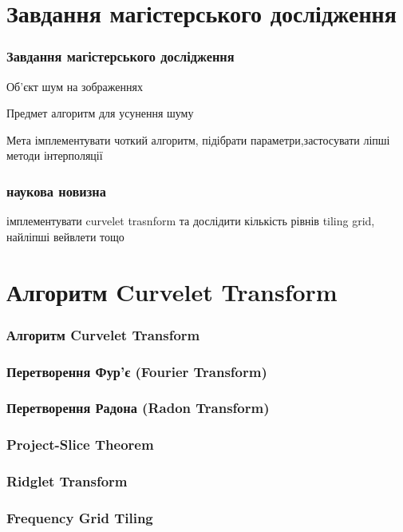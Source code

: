 \documentclass[12pt]{beamer}
\begin{document}
\section{Завдання магістерського дослідження}
\begin{frame}\frametitle{Завдання магістерського дослідження}
	\begin{block}{Об'єкт}
		шум на зображеннях
	\end{block}
	\begin{block}{Предмет}
			алгоритм для усунення шуму
	\end{block}
	\begin{block}{Мета}
		імплементувати чоткий алгоритм, \newline підібрати параметри,\newline  застосувати ліпші методи інтерполяції
	\end{block}
\end{frame}

\begin{frame}\frametitle{наукова новизна}
	імплементувати curvelet trasnform та дослідити кількість рівнів tiling grid, найліпші вейвлети тощо
\end{frame}

\section{Алгоритм Curvelet Transform}
\begin{frame}\frametitle{Алгоритм Curvelet Transform }
\end{frame}

\begin{frame}\frametitle{Перетворення Фур'є (Fourier Transform)  }
\end{frame}

\begin{frame}\frametitle{Перетворення Радона (Radon Transform) }
\end{frame}

\begin{frame}\frametitle{Project-Slice Theorem }
\end{frame}

\begin{frame}\frametitle{Ridglet Transform }
\end{frame}

\begin{frame}\frametitle{Frequency Grid Tiling }
\end{frame}
\end{document}
